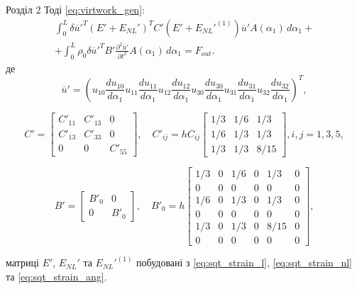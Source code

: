 \documentclass[8pt]{beamer}
\numberwithin{figure}{section}
\numberwithin{equation}{section}
\numberwithin{table}{section}
\begin{document}
\begin{frame}{Розділ 2}
Тоді \eqref{eq:virtwork_gen}:
\begin{multline}
\int_0^L \delta\overline{u}'^T \left( E' + E_{NL}' \right)^T C' \left( E' + E_{NL}'^{(1)} \right)\overline{u}' A\left(\alpha_1\right)\, d\alpha_1+\\+\int_0^L \rho_0 \delta\overline{u}'^T B'\frac{\partial^2 \overline{u}'}{\partial t^2} A\left(\alpha_1\right)\, d\alpha_1=F_{out}.
\end{multline}
де
\[
\overline{u}' = \left( u_{10}
\frac { du_{10}} { d \alpha_1}
u_{11} 
\frac { du_{11}} { d \alpha_1}
u_{12}
\frac { du_{12}} { d \alpha_1} 
u_{30}
\frac { du_{30}} { d \alpha_1}
u_{31} 
\frac { du_{31}} { d \alpha_1}
u_{32}
\frac { du_{32}} { d \alpha_1} 
\right)^T,
\]


\[
C'=\left[
\begin{array}{ccc}
C'_{11} & C'_{13} & 0 \\ 
C'_{13} & C'_{33} & 0 \\ 
0 & 0 & C'_{55}
\end{array} 
\right], \quad 
C'_{ij}=hC_{ij}\left[
\begin{array}{ccc}
1/3 & 1/6 & 1/3 \\ 
1/6 & 1/3 & 1/3 \\ 
1/3 & 1/3 & 8/15
\end{array} 
\right], i,j=1,3,5,
\]

\[
B'=\left[
\begin{array}{cc}
B'_0 & 0 \\ 
0 & B'_0
\end{array} 
\right], \quad 
B'_0=h\left[
\begin{array}{cccccc}
1/3 & 0 & 1/6 & 0 & 1/3 & 0 \\ 
0 & 0 & 0 & 0 & 0 & 0 \\ 
1/6 & 0 & 1/3 & 0 & 1/3 & 0 \\ 
0 & 0 & 0 & 0 & 0 & 0 \\ 
1/3 & 0 & 1/3 & 0 & 8/15 & 0\\
0 & 0 & 0 & 0 & 0 & 0 
\end{array} 
\right],
\]

матриці $E'$, $E_{NL}'$ та $E_{NL}'^{(1)}$ побудовані з \eqref{eq:sqt_strain_l}, \eqref{eq:sqt_strain_nl} та \eqref{eq:sqt_strain_ang}.

\end{frame}
\end{document}
